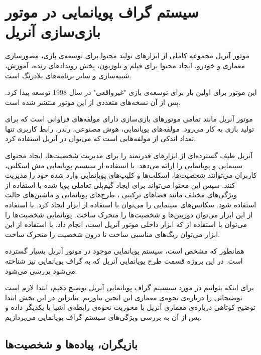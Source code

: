 \chapter {سیستم گراف پویانمایی در موتور بازی‌سازی آنریل}

موتور آنریل مجموعه کاملی از ابزار‌های تولید محتوا برای توسعه‌ی بازی، مصورسازی معماری و خودرو، 
ایجاد محتوا برای فیلم و تلوزیون،
پخش رویداد‌های زنده، آموزش، شبیه‌سازی 
و سایر برنامه‌های بلادرنگ است.

این موتور برای اولین بار برای توسعه‌ی بازی "غیرواقعی" در سال 1998 توسعه پیدا کرد.
پس از آن نسخه‌های متعددی از این موتور منتشر شده است.
\cite{UnrealEngineWikiPedia}

موتور آنریل مانند تمامی موتور‌های بازی‌سازی دارای مولفه‌های فراوانی است که برای 
تولید بازی به کار می‌رود.
مولفه‌های پویانمایی، هوش مصنوعی، رندر، رابط کاربری تنها تعداد اندکی از مولفه‌هایی است که ‌می‌توان در 
آنریل استفاده کرد.

آنریل طیف گسترده‌ای از ابزار‌های قدرتمند را برای مدیریت شخصیت‌ها، ایجاد محتوای سینمایی 
و پویانمایی را ارائه می‌دهد.
با استفاده از سیستم پویانمایی مش اسکلتی، 
کاربران می‌توانند شخصیت‌ها، اسکلت‌ها و کلیپ‌های پویانمایی 
وارد شده خود را مدیریت کنند.
سپس این محتوا می‌تواند برای ایجاد گیم‌پلی تعاملی پویا شده با استفاده از 
ویژگی‌های مختلف مانند 
فضا‌های ترکیبی 
، طرح‌های پویانمایی 
و ماشین‌های حالت 
استفاده شود.
سکانس‌های سینمایی را می‌توان با استفاده از ابزار 
ایجاد کرد. با استفاده از این ابزار می‌توان 
دوربین‌ها و شخصیت‌ها را متحرک ساخت.
پویانمایی شخصیت‌ها را می‌توان با استفاده از 
که ابزار داخلی 
موتور آنریل است، انجام داد.
با استفاده از این ابزار می‌توان ریگ‌های مناسبی ساخت تا 
درون 
شخصیت را متحرک ساخت.
\cite{UnrealEngineAnimation}

همانطور که مشخص است، سیستم پویانمایی موجود در موتور آنریل بسیار گسترده است. در این پروژه 
قسمت طرح پویانمایی آنریل که به گراف پویانمایی نیز شناخته می‌شود بررسی می‌شود.

برای اینکه بتوانیم در مورد سیسیتم گراف پویانمایی آنریل توضیح دهیم، ابتدا لازم است 
توضیحاتی را درباره‌ی نحوه‌ی معماری این انجین بیاوریم. بنابراین در این بخش ابتدا توضیح کوتاهی 
درباره‌ی معماری آنریل با محوریت نحوه‌ی رابطه‌‌ی اشیا با یکدیگر داده و 
پس از آن به بررسی ویژگی‌های سیستم گراف پویانمایی می‌پردازیم.

 
\section{بازیگران، پیاده‌ها و شخصیت‌‌ها}

